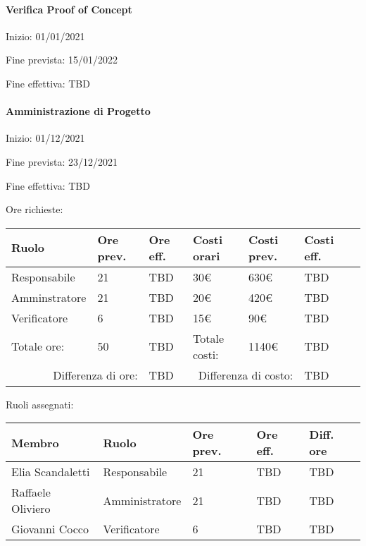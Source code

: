 \documentclass[a4paper, 12pt]{article}
\begin{document}
\paragraph{Verifica Proof of Concept}
Inizio: 01/01/2021\par
Fine prevista: 15/01/2022\par
Fine effettiva: TBD

\paragraph{Amministrazione di Progetto}
Inizio: 01/12/2021\par
Fine prevista: 23/12/2021\par
Fine effettiva: TBD

Ore richieste:\\[0.5em]
\begin{tabular}{|l|l|l||l|l|l|l|}\hline
Ruolo & Ore prev. & Ore eff. & Costi orari & Costi prev. & Costi eff.\\\hline
Responsabile & 21 & TBD & 30\euro & 630\euro & TBD \\\hline
Amminstratore & 21 & TBD & 20\euro & 420\euro & TBD \\\hline
Verificatore & 6 & TBD & 15\euro & 90\euro & TBD \\\hline
Totale ore: & 50 & TBD & Totale costi: & 1140\euro & TBD \\\hline
\multicolumn{2}{|r|}{Differenza di ore:} & TBD & \multicolumn{2}{r|}{Differenza di costo:} & TBD \\\hline
\end{tabular}

Ruoli assegnati:\\[0.5em]
\begin{tabular}{|l|l|l|l|l|}\hline
Membro & Ruolo & Ore prev. & Ore eff. & Diff. ore \\\hline
Elia Scandaletti & Responsabile & 21 & TBD & TBD \\\hline
Raffaele Oliviero & Amministratore & 21 & TBD & TBD \\\hline
Giovanni Cocco & Verificatore & 6 & TBD & TBD \\\hline
\end{tabular}
\end{document}
